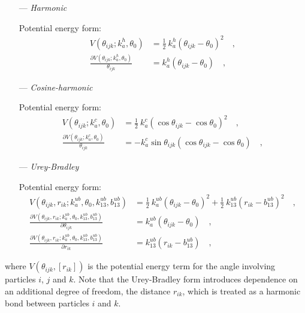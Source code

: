 \documentclass[10pt,a4paper,openany]{memoir}
\numberwithin{equation}{section}
\begin{document}
\begin{itemize}
\item [---] \textit{Harmonic}
  \par
  Potential energy form:
  \begin{align}
    \label{eq:harmonic-angle-energy}
    V(\theta_{ijk}; k_a^h, \theta_0) & = \frac{1}{2} \ k_a^h (\theta_{ijk} - \theta_0)^2 \quad , \\ \nonumber
    \frac{\partial V(\theta_{ijk}; k_a^h, \theta_0)}{\theta_{ijk}} & = k_a^h (\theta_{ijk} - \theta_0) \quad ,
  \end{align}
  
\item [---] \textit{Cosine-harmonic}
  \par
  Potential energy form:
  \begin{align}
    \label{eq:cosine-angle-energy}
    V(\theta_{ijk}; k_a^c, \theta_0) & = \frac{1}{2} \ k_a^c (\cos{\theta_{ijk}} - \cos\theta_0)^2 \quad , \\ \nonumber
    \frac{\partial V(\theta_{ijk}; k_a^c, \theta_0)}{\theta_{ijk}} & = -k_a^c \sin{\theta_{ijk}}(\cos{\theta_{ijk}} - \cos\theta_0) \quad ,
  \end{align}

\item [---] \textit{Urey-Bradley}
  \par
  Potential energy form:
  \begin{align}
    \label{eq:ub-angle-energy}
    V(\theta_{ijk},r_{ik}; k_a^{ub}, \theta_0,k_{13}^{ub},b_{13}^{ub}) & = \frac{1}{2} \ k_a^{ub} (\theta_{ijk} - \theta_0)^2 + \frac{1}{2}  \ k_{13}^{ub} (r_{ik} - b_{13}^{ub})^2 \quad , \\ \nonumber
    \frac{\partial V(\theta_{ijk},r_{ik}; k_a^{ub}, \theta_0,k_{13}^{ub},b_{13}^{ub})}{\partial \theta_{ijk}} & = k_a^{ub} (\theta_{ijk} - \theta_0) \quad , \\ \nonumber
    \frac{\partial V(\theta_{ijk},r_{ik}; k_a^{ub}, \theta_0,k_{13}^{ub},b_{13}^{ub})}{\partial r_{ik}}  & = k_{13}^{ub} (r_{ik} - b_{13}^{ub}) \quad ,
  \end{align}

\end{itemize}  
\noindent
where $V(\theta_{ijk},[r_{ik}])$ is the potential energy term for the angle involving particles $i$, $j$ and $k$.
Note that the Urey-Bradley form introduces dependence on an additional degree of freedom, the distance $r_{ik}$, which is treated as a harmonic bond between particles $i$ and $k$.
\end{document}
